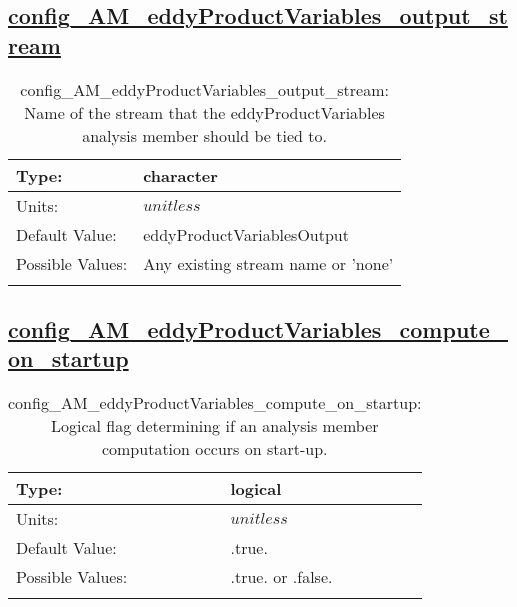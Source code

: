 \subsection[config\_AM\_eddyProductVariables\_output\_stream]{\hyperref[sec:nm_tab_AM_eddyProductVariables]{config\_AM\_eddyProductVariables\_output\_stream}}
\label{subsec:nm_sec_config_AM_eddyProductVariables_output_stream}
\begin{center}
\begin{longtable}{| p{2.0in} || p{4.0in} |}
    \hline
    Type: & character \\
    \hline
    Units: & $unitless$ \\
    \hline
    Default Value: & eddyProductVariablesOutput \\
    \hline
    Possible Values: & Any existing stream name or 'none' \\
    \hline
    \caption{config\_AM\_eddyProductVariables\_output\_stream: Name of the stream that the eddyProductVariables analysis member should be tied to.}
\end{longtable}
\end{center}
\subsection[config\_AM\_eddyProductVariables\_compute\_on\_startup]{\hyperref[sec:nm_tab_AM_eddyProductVariables]{config\_AM\_eddyProductVariables\_compute\_on\_startup}}
\label{subsec:nm_sec_config_AM_eddyProductVariables_compute_on_startup}
\begin{center}
\begin{longtable}{| p{2.0in} || p{4.0in} |}
    \hline
    Type: & logical \\
    \hline
    Units: & $unitless$ \\
    \hline
    Default Value: & .true. \\
    \hline
    Possible Values: & .true. or .false. \\
    \hline
    \caption{config\_AM\_eddyProductVariables\_compute\_on\_startup: Logical flag determining if an analysis member computation occurs on start-up.}
\end{longtable}
\end{center}
